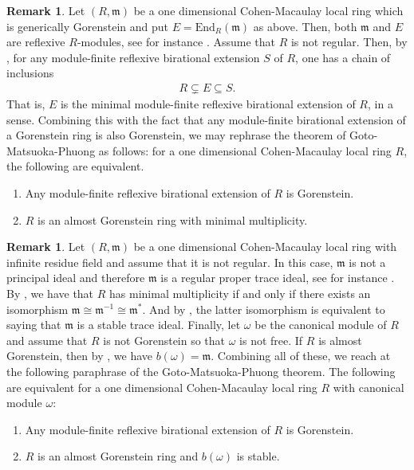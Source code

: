 \documentclass[12pt]{amsart}
\newcommand{\End}{\mathrm{End}}
\newcommand{\m}{\mathfrak{m}}
\theoremstyle{definition}
\newtheorem{remark}[theorem]{Remark}
\begin{document}
\begin{remark}
    Let $(R,\m)$ be a one dimensional Cohen-Macaulay local ring which is generically Gorenstein and put $E = \End_R(\m)$ as above. Then, both $\m$ and $E$ are reflexive $R$-modules, see for instance \cite[Lemma 2.5]{Kobayashi}. Assume that $R$ is not regular. Then, by \cite[Lemma 2.2]{Kobayashi-self-dual}, for any module-finite reflexive birational extension $S$ of $R$, one has a chain of inclusions 
    \begin{align*}
    R \subsetneq E \subseteq S.
    \end{align*}
    That is, $E$ is the minimal module-finite reflexive birational extension of $R$, in a sense. Combining this with the fact that any module-finite birational extension of a Gorenstein ring is also Gorenstein, we may rephrase the theorem of Goto-Matsuoka-Phuong as follows: for a one dimensional Cohen-Macaulay local ring $R$, the following are equivalent.
    \begin{enumerate}
        \item Any module-finite reflexive birational extension of $R$ is Gorenstein.
        \item $R$ is an almost Gorenstein ring with minimal multiplicity.
    \end{enumerate}      
\end{remark}
\begin{remark}
    Let $(R,\m)$ be a one dimensional Cohen-Macaulay local ring with infinite residue field and assume that it is not regular. In this case, $\m$ is not a principal ideal and therefore $\m$ is a regular proper trace ideal, see for instance \cite[Proposition 2.8]{Herzog-Rahimbeigi}. By \cite[Proposition 2.5]{Ooishi}, we have that $R$ has minimal multiplicity if and only if there exists an isomorphism $\m \cong \m^{-1} \cong \m^*$. And by \cite[Proposition 3.3]{Dao-Lindo}, the latter isomorphism is equivalent to saying that $\m$ is a stable trace ideal. Finally, let $\omega$ be the canonical module of $R$ and assume that $R$ is not Gorenstein so that $\omega$ is not free. If $R$ is almost Gorenstein, then by \cite[Theorem 7.1]{Dao-Maitra-Sridhar}, we have $b(\omega) = \m$. Combining all of these, we reach at the following paraphrase of the Goto-Matsuoka-Phuong theorem. The following are equivalent for a one dimensional Cohen-Macaulay local ring $R$ with canonical module $\omega$:
    \begin{enumerate}
        \item Any module-finite reflexive birational extension of $R$ is Gorenstein.
        \item $R$ is an almost Gorenstein ring and $b(\omega)$ is stable.
    \end{enumerate}
\end{remark}
\end{document}
